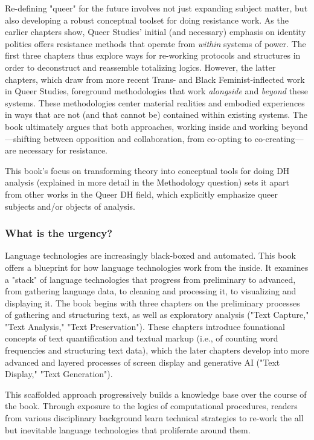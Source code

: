 \documentclass[11pt]{article}
\begin{document}
Re-defining "queer" for the future involves not just expanding subject
matter, but also developing a robust conceptual toolset for doing
resistance work. As the earlier chapters show, Queer Studies' initial
(and necessary) emphasis on identity politics offers resistance
methods that operate from \emph{within} systems of power. The first three
chapters thus explore ways for re-working protocols and structures in
order to deconstruct and reassemble totalizing logics. However, the
latter chapters, which draw from more recent Trans- and Black
Feminist-inflected work in Queer Studies, foreground methodologies
that work \emph{alongside} and \emph{beyond} these systems. These methodologies
center material realities and embodied experiences in ways that are
not (and that cannot be) contained within existing systems. The book
ultimately argues that both approaches, working inside and working
beyond---shifting between opposition and collaboration, from co-opting
to co-creating---are necessary for resistance.

This book's focus on transforming theory into conceptual tools for
doing DH analysis (explained in more detail in the Methodology
question) sets it apart from other works in the Queer DH field, which
explicitly emphasize queer subjects and/or objects of analysis.

\subsubsection{What is the urgency?}
\label{sec:org62458f6}
Language technologies are increasingly black-boxed and automated. This
book offers a blueprint for how language technologies work from the
inside. It examines a "stack" of language technologies that progress
from preliminary to advanced, from gathering language data, to
cleaning and processing it, to visualizing and displaying it. The book
begins with three chapters on the preliminary processes of gathering
and structuring text, as well as exploratory analysis ("Text Capture,"
"Text Analysis," "Text Preservation"). These chapters introduce
founational concepts of text quantification and textual markup (i.e.,
of counting word frequencies and structuring text data), which the
later chapters develop into more advanced and layered processes of
screen display and generative AI ("Text Display," "Text Generation").

This scaffolded approach progressively builds a knowledge base over
the course of the book. Through exposure to the logics of
computational procedures, readers from various disciplinary background
learn technical strategies to re-work the all but inevitable language
technologies that proliferate around them.
\end{document}
